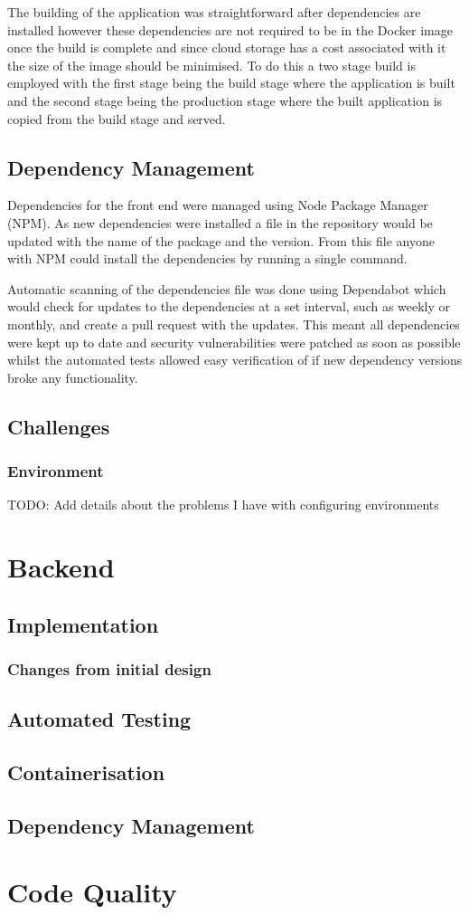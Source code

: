 The building of the application was straightforward after dependencies are installed however these dependencies are not required to be in the Docker image once the build is complete and since cloud storage has a cost associated with it the size of the image should be minimised. To do this a two stage build is employed with the first stage being the build stage where the application is built and the second stage being the production stage where the built application is copied from the build stage and served.

\subsection{Dependency Management}
Dependencies for the front end were managed using Node Package Manager (NPM). As new dependencies were installed a file in the repository would be updated with the name of the package and the version. From this file anyone with NPM could install the dependencies by running a single command.

Automatic scanning of the dependencies file was done using Dependabot which would check for updates to the dependencies at a set interval, such as weekly or monthly, and create a pull request with the updates. This meant all dependencies were kept up to date and security vulnerabilities were patched as soon as possible whilst the automated tests allowed easy verification of if new dependency versions broke any functionality.

\subsection{Challenges}
\subsubsection{Environment}
TODO: Add details about the problems I have with configuring environments

\section{Backend}
\subsection{Implementation}
\subsubsection{Changes from initial design}
\subsection{Automated Testing}
\subsection{Containerisation}
\subsection{Dependency Management}

\section{Code Quality} \label{sec:code-quality}
